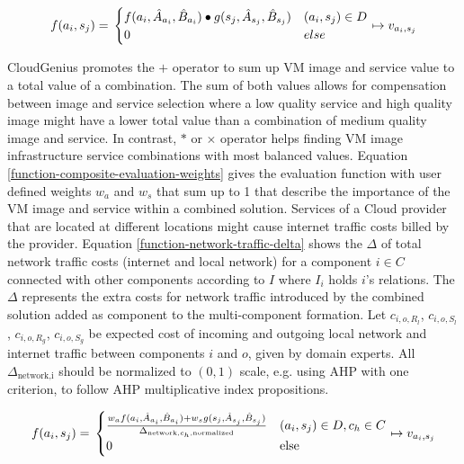 \documentclass[10pt]{article}
\begin{document}
\begin{equation}\label{function-composite-evaluation}
f(a_i,s_j) = \\
\begin{cases}
f(a_i,\hat{A}_{a_i},\hat{B}_{a_i}) \bullet g(s_j,\hat{A}_{s_j},\hat{B}_{s_j}) & (a_i,s_j) \in D\\
0 & else\\
\end{cases}
\mapsto{} v_{a_i,s_j}
\end{equation}


CloudGenius promotes the $+$ operator to sum up VM image and service value to a total value of a combination. The sum of both values allows for compensation between image and service selection where a low quality service and high quality image might have a lower total value than a combination of medium quality image and service. In contrast, $*$ or $\times$ operator helps finding VM image infrastructure service combinations with most balanced values. Equation \ref{function-composite-evaluation-weights} gives the evaluation function with user defined weights $w_a$ and $w_s$ that sum up to 1 that describe the importance of the VM image and service within a combined solution.
Services of a Cloud provider that are located at different locations might cause internet traffic costs billed by the provider. 
Equation \ref{function-network-traffic-delta} shows the $\Delta$ of total network traffic costs (internet and local network) for a component $i \in C$ connected with other components according to $I$ where $I_i$ holds $i$'s relations. The $\Delta$ represents the extra costs for network traffic introduced by the combined solution added as component to the multi-component formation. Let $c_{i,o,R_l}$, $c_{i,o,S_l}$, $c_{i,o,R_g}$, $c_{i,o,S_g}$ be expected cost of incoming and outgoing local network and internet traffic between components $i$ and $o$, given by domain experts. All $\Delta_{\text{network,i}}$ should be normalized to $(0, 1)$ scale, e.g. using AHP with one criterion, to follow AHP multiplicative index propositions.


\begin{equation}\label{function-composite-evaluation-weights}
f(a_i,s_j) = \\
\begin{cases}
w_a f(a_i,\hat{A}_{a_i},\hat{B}_{a_i}) + w_s g(s_j,\hat{A}_{s_j},\hat{B}_{s_j})\over{\Delta_{\text{network},c_h,\text{normalized}}} & (a_i,s_j) \in D, c_h \in C\\
0 & \text{else}\\
\end{cases}
\mapsto{} v_{a_i,s_j}
\end{equation}
\end{document}
